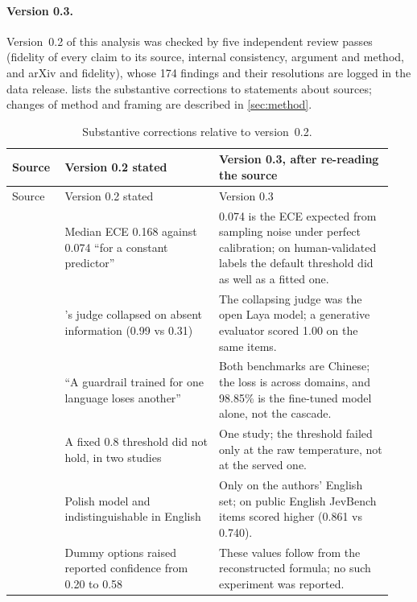 \paragraph{Version 0.3.}
Version~0.2 of this analysis was checked by five independent review passes (fidelity of every claim to its source, internal consistency, argument and method, and arXiv and \pol{} fidelity), whose 174 findings and their resolutions are logged in the data release.
 lists the substantive corrections to statements about sources; changes of method and framing are described in \cref{sec:method}.

\begingroup
\small
\renewcommand{\arraystretch}{1.2}
\begin{longtable}{@{}p{0.13\linewidth}p{0.38\linewidth}p{0.43\linewidth}@{}}
\caption{Substantive corrections relative to version~0.2.}\label{tab:corrections3}\\
\toprule
Source & Version 0.2 stated & Version 0.3, after re-reading the source \\
\midrule
\endfirsthead
\toprule
Source & Version 0.2 stated & Version 0.3 \\
\midrule
\endhead
\bottomrule
\endfoot
\cite{arx29429} & Median ECE 0.168 against 0.074 ``for a constant predictor'' & 0.074 is the ECE expected from sampling noise under perfect calibration; on human-validated labels the default threshold did as well as a fitted one. \\
\cite{zen22901853} & \jev{}'s judge collapsed on absent information (0.99 vs 0.31) & The collapsing judge was the open Laya model; a generative evaluator scored 1.00 on the same items. \\
\cite{arx33671} & ``A guardrail trained for one language loses another'' & Both benchmarks are Chinese; the loss is across domains, and 98.85\% is the fine-tuned model alone, not the cascade.  \\
\cite{zen22959854} & A fixed 0.8 threshold did not hold, in two studies & One study; the threshold failed only at the raw temperature, not at the served one. \\
\cite{zen23022986} & Polish model and \jev{} indistinguishable in English & Only on the authors' English set; on public English JevBench items \jev{} scored higher (0.861 vs 0.740). \\
\cite{yurin2026confident} & Dummy options raised reported confidence from 0.20 to 0.58 & These values follow from the reconstructed formula; no such experiment was reported. \\

\end{longtable}
